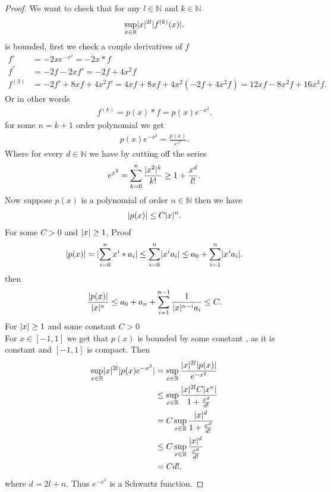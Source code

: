 \begin{proof}
 We want to check that for any $l \in  \mathbb{N}$ and $k \in  \mathbb{N}$ 
 \begin{align*}
   \sup_{x \in  \mathbb{R}} \lvert x\rvert^{2l} \lvert f^{(k)}(x) \rvert 
 .\end{align*}
 is bounded, first we check a couple derivatives of $f$
 \begin{align*}
   f' &=  -2xe^{-x^2}   = -2x*f\\
   f^{''} &= -2f - 2xf' =  -2f +4x^2 f \\
   f^{(3)} &= -2f' + 8xf + 4x^2f' = 4xf + 8xf + 4x^2(-2f + 4x^2f)  = 12xf -8x^2f + 16x^{4}f 
 .\end{align*}
Or in other words
\begin{align*}
  f^{(k)} = p(x)*f = p(x)e^{-x^2} 
.\end{align*}
for some $n=k+1$ order polynomial we get 
\begin{align*}
  p(x)e^{-x^2} = \frac{p(x)}{e^{x^2} } 
.\end{align*}
Where for every $d \in  \mathbb{N}$ we have by cutting off the series
\begin{align*}
  e^{x^2} = \sum_{k=0}^{n} \frac{\lvert x^2\rvert^{k} }{k!} \ge  1 + \frac{x^{d}}{l!}
.\end{align*}
Now suppose $p(x)$ is a polynomial of order $n \in  \mathbb{N}$ then we have 
\begin{align*}
  \lvert p(x)\rvert \le C \lvert x\rvert^{n} 
.\end{align*}
For some $C > 0$  and $\lvert x\rvert \ge 1$, Proof
\begin{align*}
  \lvert p(x)\rvert = \lvert\sum_{i=0}^{n}  x^{i}*a_i\rvert \le  \sum_{i=0}^{n} \lvert x^{i} a_i\rvert \le  a_0 + \sum_{i=1}^{n} \lvert x^{i} a_i\rvert 
.\end{align*}
then 
\begin{align*}
  \frac{\lvert p(x)\rvert}{\lvert x\rvert^{n} } \le  a_0 + a_n + \sum_{i=1}^{n-1} \frac{1}{\lvert x\rvert^{n-i}a_i}   \le  C
.\end{align*}
For $\lvert x\rvert \ge  1$ and some constant $C>0$ \\[1ex]
For $x \in  [-1,1]$ we get that $p(x)$ is bounded by some constant , as it is constant and $[-1,1]$ is compact.
Then 
\begin{align*}
  \sup_{x \in \mathbb{R}} \lvert x\rvert^{2l}\lvert p(x)e^{-x^2} \rvert &= \sup_{x \in \mathbb{R}} \frac{\lvert x\rvert^{2l}\lvert p(x)\rvert }{e^{-x^2} } \\
                                                          &\le  \sup_{x \in \mathbb{R}} \frac{\lvert x\rvert^{2l}C\lvert x^{n} \rvert }{1+\frac{x^{d}}{d!} }\\
                                                          &=  C\sup_{x \in \mathbb{R}} \frac{\lvert x\rvert^{d} }{1+\frac{x^{d}}{d!} }\\
                                                          &\le C\sup_{x \in \mathbb{R}} \frac{\lvert x\rvert^{d} }{\frac{x^{d}}{d!} }\\
                                                          &=  C d!
.\end{align*}
where $d  = 2l+n$. Thus $e^{-x^2} $ is a Schwartz function.
\end{proof}
